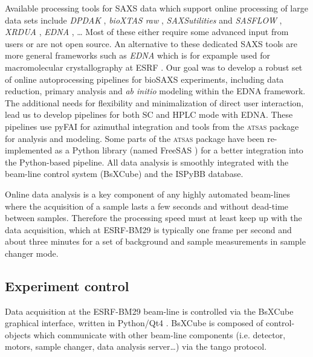 \documentclass[preprint,pdf]{iucr}              %
\begin{document}
Available processing tools for SAXS data which support online processing of
large data sets include \textit{DPDAK} \cite{DPDAK}, \textit{bioXTAS raw}
\cite{BioXTASraw}, \textit{SAXSutilities} \cite{SAXSUtilities} and
\textit{SASFLOW} \cite{X33P,P12},  \textit{XRDUA} \cite{XRDUA}, \textit{EDNA}
, \ldots 
Most of these either require some advanced input from users or are not open source.  
An alternative to these dedicated SAXS tools are more general frameworks such as \textit{EDNA} which is for expample used for macromolecular crystallography at ESRF \cite{EDNA}.
Our goal was to develop a robust set of online autoprocessing pipelines
for bioSAXS experiments, including data reduction, primary analysis and \textit{ab
initio} modeling  within the EDNA framework. 
The additional needs for flexibility and minimalization of
direct user interaction, lead us to develop pipelines for both SC and HPLC mode with EDNA.
These pipelines use pyFAI for azimuthal integration \cite{pyFAI} and tools
from the \textsc{atsas} package \cite{ATSAS1, ATSAS2} for analysis and modeling.
Some parts of the \textsc{atsas} package have been re-implemented as a Python
library (named FreeSAS \cite{freesas}) for a better integration into the
Python-based pipeline.
All data analysis is smoothly integrated with the beam-line control system
(BsXCube) and the ISPyBB \cite{ISPYBB} database.


Online data analysis is a key component of any highly automated beam-lines
where the acquisition of a sample lasts a few seconds and without dead-time between samples.
Therefore the processing speed must at least keep up with the data acquisition, which
at ESRF-BM29 is typically one frame per second and about three minutes for a set
of background and sample measurements in sample changer mode.


\subsection{Experiment control}
Data acquisition at the ESRF-BM29 beam-line is controlled via the BsXCube
graphical interface, written in Python/Qt4 \cite{pyqt}.
BsXCube is composed of control-objects which communicate with other beam-line
components (i.e. detector, motors, sample changer, data analysis server\ldots)
via the tango protocol\cite{tango}.

\end{document}
